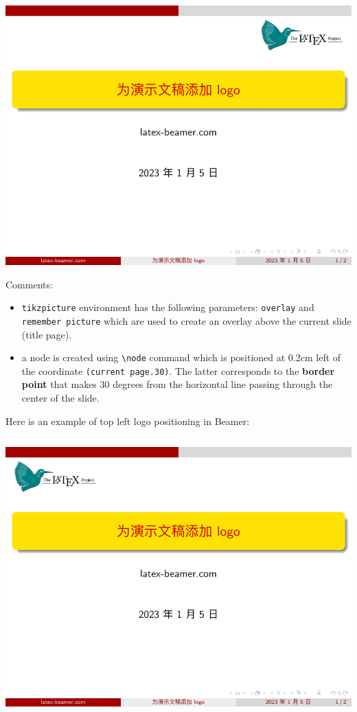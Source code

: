 \includegraphics[page=1]{examples/beamer/logo-position1.pdf}

Comments:

\begin{itemize}
  \item \verb|tikzpicture| environment has the following parameters: \verb|overlay| and \verb|remember picture| which are used to create an overlay above the current slide (title page).
  \item a node is created using \verb|\node| command which is positioned at 0.2cm left of the coordinate \verb|(current page.30)|. The latter corresponds to the {\bfseries border point} that makes 30 degrees from the horizontal line passing through the center of the slide.
\end{itemize}

Here is an example of top left logo positioning in Beamer:

\inputminted[linenos=true]{latex}{examples/beamer/logo-position2.tex}

\includegraphics[page=1]{examples/beamer/logo-position2.pdf}

